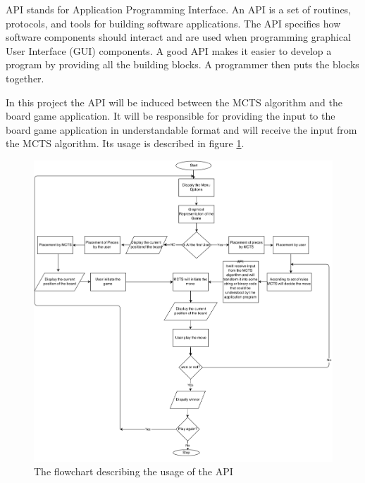 API stands for Application Programming Interface. An API is a set of routines, protocols, and tools for building software applications. The API specifies how software components should interact and are used when programming graphical User Interface (GUI) components. A good API makes it easier to develop a program by providing all the building blocks. A programmer then puts the blocks together.

 In this project the API will be induced between the MCTS algorithm and the board game application. It will be responsible for providing the input to the board game application in understandable format and will receive the input from the MCTS algorithm. Its usage is described in figure \ref{fig:flowchart}.

\bigbreak

\begin{figure}[H]
	\centering
	\includegraphics[width=\textwidth]{2General_Architecture/2.2API/img/DiagramAPI.png}
	\caption{The flowchart describing the usage of the API}
	\label{fig:flowchart}
\end{figure}


